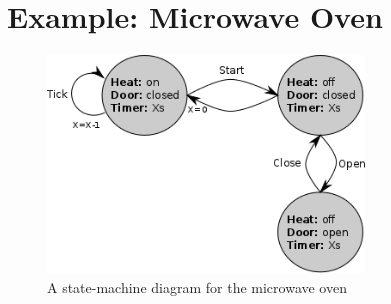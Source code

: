 \newpage
\section{Example: Microwave Oven}
\begin{figure}[!t]
\centering
\includegraphics[width=0.75\textwidth]{../images/microwave.png}
\caption{A state-machine diagram for the microwave oven}
\end{figure}

